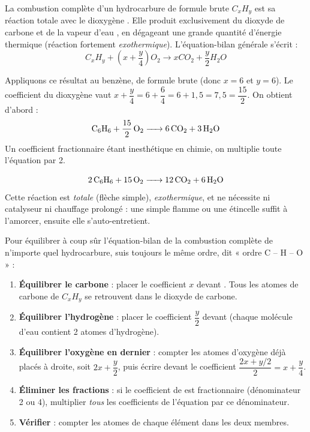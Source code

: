 \documentclass[11pt]{article}
\newcommand{\cle}[1]{{\popxbold\color{popdark}#1}}
\begin{document}
\begin{definition}
La \cle{combustion complète} d'un hydrocarbure de formule brute $C_xH_y$ est sa réaction totale avec le dioxygène . Elle produit exclusivement du \cle{dioxyde de carbone}  et de la \cle{vapeur d'eau} , en dégageant une grande quantité d'énergie thermique (réaction fortement \emph{exothermique}). L'équation-bilan générale s'écrit :
\[ C_xH_y + \left(x + \frac{y}{4}\right) O_2 \longrightarrow x CO_2 + \frac{y}{2} H_2O \]
\end{definition}

Appliquons ce résultat au benzène, de formule brute  (donc $x = 6$ et $y = 6$). Le coefficient du dioxygène vaut $x + \dfrac{y}{4} = 6 + \dfrac{6}{4} = 6 + 1{,}5 = 7{,}5 = \dfrac{15}{2}$. On obtient d'abord :
\[ \ce{C6H6 + 15/2 O2 -> 6 CO2 + 3 H2O} \]
Un coefficient fractionnaire étant inesthétique en chimie, on multiplie toute l'équation par 2.

\begin{aretenir}
\[ \ce{2 C6H6 + 15 O2 -> 12 CO2 + 6 H2O} \]
Cette réaction est \emph{totale} (flèche simple), \emph{exothermique}, et ne nécessite ni catalyseur ni chauffage prolongé : une simple flamme ou une étincelle suffit à l'amorcer, ensuite elle s'auto-entretient.
\end{aretenir}

\begin{methode}
Pour équilibrer à coup sûr l'équation-bilan de la combustion complète de n'importe quel hydrocarbure, suis toujours le même ordre, dit « ordre C -- H -- O » :
\begin{enumerate}
\item \textbf{Équilibrer le carbone} : placer le coefficient $x$ devant . Tous les atomes de carbone de $C_xH_y$ se retrouvent dans le dioxyde de carbone.
\item \textbf{Équilibrer l'hydrogène} : placer le coefficient $\dfrac{y}{2}$ devant  (chaque molécule d'eau contient 2 atomes d'hydrogène).
\item \textbf{Équilibrer l'oxygène en dernier} : compter les atomes d'oxygène déjà placés à droite, soit $2x + \dfrac{y}{2}$, puis écrire devant  le coefficient $\dfrac{2x + y/2}{2} = x + \dfrac{y}{4}$.
\item \textbf{Éliminer les fractions} : si le coefficient de  est fractionnaire (dénominateur 2 ou 4), multiplier \emph{tous} les coefficients de l'équation par ce dénominateur.
\item \textbf{Vérifier} : compter les atomes de chaque élément dans les deux membres.
\end{enumerate}
\end{methode}
\end{document}
